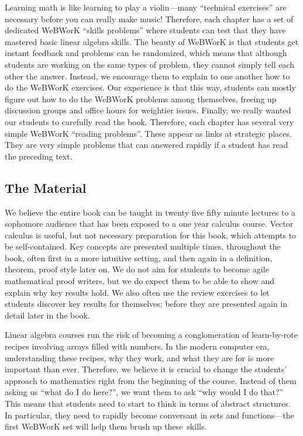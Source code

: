 Learning math is like learning to play a violin---many ``technical exercises'' are
necessary before you can really make music! Therefore, each chapter has a set of dedicated WeBWorK ``skills problems'' where students can test that they have mastered basic linear algebra skills. The beauty of WeBWorK is that students get instant feedback and
problems can be randomized, which means that although students are working on the same types of problem, they cannot simply 
tell each other the answer. Instead, we encourage them to explain to one another how to do the WeBWorK exercises. 
Our experience is that this way, students can mostly figure out how to do the WeBWorK problems among themselves, freeing up discussion groups and office hours for weightier issues.  Finally, we really wanted our students to carefully read the book. Therefore, each chapter has several very simple WeBWorK ``reading problems''. These appear as links at strategic places. They are very simple problems that can 
answered rapidly if a student has read the preceding text.

\subsection*{The Material}

We believe the entire book can be taught in twenty five fifty minute lectures to a sophomore audience that has been exposed to a one year 
calculus course. Vector calculus is useful, but not necessary preparation for this book, which attempts to be self-contained.
Key concepts are presented multiple times, throughout the book, often first in a more intuitive setting, and then again 
in a definition, theorem, proof style later on. We do not aim for students to become agile mathematical proof writers, but we 
do expect them to be able to show and explain why key results hold. We also often use the review exercises to let students discover
key results for themselves; before they are presented again in detail later in the book. 

Linear algebra courses run the risk of becoming a conglomeration of learn-by-rote recipes involving arrays filled with numbers.
In the modern computer era, understanding these recipes, why they work, and what they are for is more important than ever.
Therefore, we believe it is crucial to change the students' approach to mathematics right from the beginning of the course. Instead of
them asking us ``what do I do here?'', we want them to ask ``why would I do that?'' This means that students need to start to think in terms of
abstract structures. In particular, they need to rapidly become conversant in sets and functions---the first WeBWorK set will help 
them brush up these~skills.

